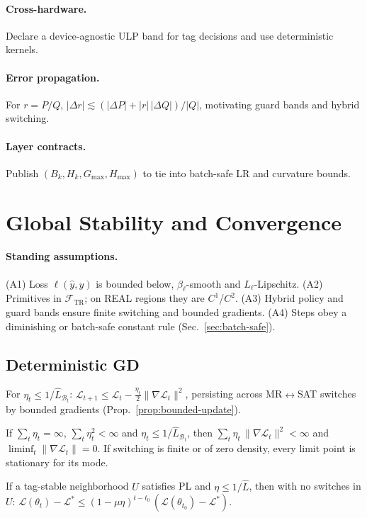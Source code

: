 \documentclass[twoside,11pt]{article}
\newcommand{\trReal}{\textsc{REAL}}
\newcommand{\TAGREAL}{\trReal}
\begin{document}
\paragraph{Cross-hardware.} Declare a device-agnostic ULP band for tag decisions and use deterministic kernels.\par
\paragraph{Error propagation.} For $r=P/Q$, $|\Delta r|\lesssim (|\Delta P|+|r|\,|\Delta Q|)/|Q|$, motivating guard bands and hybrid switching.\par
\paragraph{Layer contracts.} Publish $(B_k,H_k,G_{\max},H_{\max})$ to tie into batch-safe LR and curvature bounds.

\section*{Global Stability and Convergence}
\label{sec:global-convergence}
\paragraph{Standing assumptions.} (A1) Loss $\ell(\hat y,y)$ is bounded below, $\beta_\ell$-smooth and $L_\ell$-Lipschitz. (A2) Primitives in $\mathcal{F}_{\!\mathrm{TR}}$; on \TAGREAL{} regions they are $C^1$/$C^2$. (A3) Hybrid policy and guard bands ensure finite switching and bounded gradients. (A4) Steps obey a diminishing or batch-safe constant rule (Sec.~\ref{sec:batch-safe}).\par
\subsection*{Deterministic GD} For $\eta_t\le 1/\widehat L_{\mathcal{B}_t}$: $\mathcal{L}_{t+1}\le \mathcal{L}_t-\tfrac{\eta_t}{2}\|\nabla\mathcal{L}_t\|^2$, persisting across MR$\leftrightarrow$SAT switches by bounded gradients (Prop.~\ref{prop:bounded-update}).\par
\begin{theorem}\label{thm:gd-diminishing}
If $\sum_t\eta_t=\infty$, $\sum_t\eta_t^2<\infty$ and $\eta_t\le 1/\widehat L_{\mathcal{B}_t}$, then $\sum_t\eta_t\,\|\nabla\mathcal{L}_t\|^2<\infty$ and $\liminf_t\|\nabla\mathcal{L}_t\|=0$. If switching is finite or of zero density, every limit point is stationary for its mode.
\end{theorem}
\begin{theorem}\label{thm:pl}
If a tag-stable neighborhood $U$ satisfies PL and $\eta\le 1/\widehat L$, then with no switches in $U$:
$\mathcal{L}(\theta_{t})-\mathcal{L}^*\le (1-\mu\eta)^{t-t_0}\,(\mathcal{L}(\theta_{t_0})-\mathcal{L}^*)$.
\end{theorem}
\end{document}
